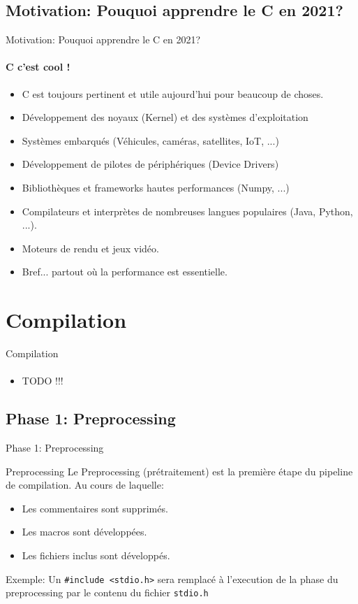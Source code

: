 \documentclass{beamer}
\begin{document}
\begin{darkframes}
  	\subsection{Motivation: Pouquoi apprendre le C en 2021?}
  	\begin{frame}{Motivation: Pouquoi apprendre le C en 2021?}
  		\framesubtitle{C c'est cool !}%
  		\begin{itemize}
  			\item C est toujours pertinent et utile aujourd'hui pour beaucoup de choses.
  			\item Développement des noyaux (Kernel) et des systèmes d'exploitation
  			\item Systèmes embarqués (Véhicules, caméras, satellites, IoT, ...)
  			\item Développement de pilotes de périphériques (Device Drivers)
  			\item Bibliothèques et frameworks hautes performances (Numpy, ...)
  			\item Compilateurs et interprètes de nombreuses langues populaires (Java, Python, ...).
  			\item Moteurs de rendu et jeux vidéo.
  			\item Bref... partout où la performance est essentielle.
  		\end{itemize}
  	\end{frame}

  	\section{Compilation}
  	\begin{frame}{Compilation}
  		\framesubtitle{}%
  		\begin{itemize}
  			\item TODO !!!
  		\end{itemize}
  	\end{frame}
  
  	\subsection{Phase 1: Preprocessing}
  	\begin{frame}{Phase 1: Preprocessing}
  		\begin{block}{Preprocessing}
  			Le \alert{Preprocessing} (prétraitement) est la \alert{première} étape du pipeline de compilation. Au cours de laquelle:
  			\begin{itemize}
  				\item Les commentaires sont supprimés.
  				\item Les macros sont développées.
  				\item Les fichiers inclus sont développés.
  			\end{itemize}
  		\end{block}
  	  	\begin{exampleblock}{Exemple:}
  			Un \texttt{\#include <stdio.h>} sera remplacé à l'execution de la phase du preprocessing par le contenu du fichier \texttt{stdio.h}
  		\end{exampleblock}
  	\end{frame}
  	

\end{darkframes}
\end{document}
